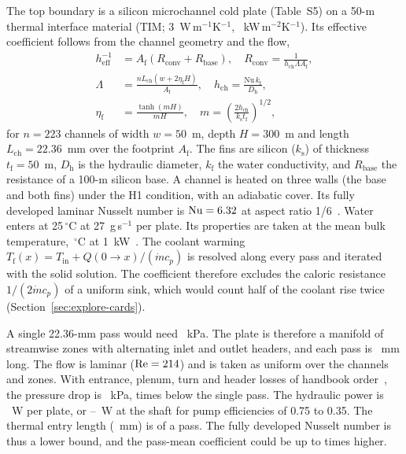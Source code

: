 The top boundary is a silicon microchannel cold plate (Table~S5) on a 50-\textmu m thermal
interface material (TIM; 3~W\,m$^{-1}$K$^{-1}$, \TimH~kW\,m$^{-2}$K$^{-1}$). Its effective coefficient
follows from the channel geometry and the flow,
\begin{equation}
\begin{aligned}
h_{\mathrm{eff}}^{-1} &= A_{\mathrm{f}}\left(R_{\mathrm{conv}} + R_{\mathrm{base}}\right),\quad
R_{\mathrm{conv}} = \frac{1}{h_{\mathrm{ch}}\Lambda A_{\mathrm{f}}},\\
\Lambda &= \frac{n L_{\mathrm{ch}}(w + 2\eta_{\mathrm{f}}H)}{A_{\mathrm{f}}},\quad
h_{\mathrm{ch}} = \frac{\mathrm{Nu}\,k_{\mathrm{f}}}{D_{\mathrm{h}}},\\
\eta_{\mathrm{f}} &= \frac{\tanh(mH)}{mH},\quad
m = \left(\frac{2h_{\mathrm{ch}}}{k_{\mathrm{s}}t_{\mathrm{f}}}\right)^{1/2},
\end{aligned}
\label{eq:heff}
\end{equation}
for $n = 223$ channels of width $w = 50$~\textmu m, depth $H = 300$~\textmu m and length
$L_{\mathrm{ch}} = 22.36$~mm over the footprint $A_{\mathrm{f}}$. The fins are silicon
($k_{\mathrm{s}}$) of thickness $t_{\mathrm{f}} = 50$~\textmu m, $D_{\mathrm{h}}$ is the
hydraulic diameter, $k_{\mathrm{f}}$ the water conductivity, and $R_{\mathrm{base}}$ the
resistance of a 100-\textmu m silicon base. A channel is heated on three walls (the base and both fins)
under the H1 condition, with an adiabatic cover. Its fully developed laminar Nusselt number is
$\mathrm{Nu} = 6.32$ at aspect ratio 1/6~\cite{ShahLondon1978,QuMudawar2002}. Water enters
at 25\,$^\circ$C at 27~g\,s$^{-1}$ per plate. Its properties are taken at the mean bulk
temperature, \MthTbulk\,$^\circ$C at 1~kW~\cite{NISTWebBook}. The coolant warming
$T_{\mathrm{f}}(x) = T_{\mathrm{in}} + Q(0\!\to\!x)/(\dot m c_p)$ is resolved along every pass
and iterated with the solid solution. The coefficient therefore excludes the caloric resistance
$1/(2\dot m c_p)$ of a uniform sink, which would count half of the coolant rise twice
(Section~\ref{sec:explore-cards}).

A single 22.36-mm pass would need \CoolDpSinglePass~kPa. The plate is therefore a manifold of
\CoolZonesWord{} streamwise zones with alternating inlet and outlet headers, and each pass is
\CoolPassMm~mm long. The flow is laminar ($\mathrm{Re} = 214$) and is taken as uniform over the
channels and zones. With entrance, plenum, turn and header losses of
handbook order~\cite{Idelchik1996}, the pressure drop is \CoolDp~kPa, \CoolDpRatio{} times
below the single pass. The hydraulic power is \CoolPhyd~W per plate, or
\CoolPshaftLo--\CoolPshaftHi~W at the shaft for pump efficiencies of 0.75 to 0.35. The thermal
entry length (\CoolLth~mm) is \MthLthRatio{} of a pass. The fully developed Nusselt number is
thus a lower bound, and the pass-mean coefficient could be up to \MthNuDevRatio{} times higher.

